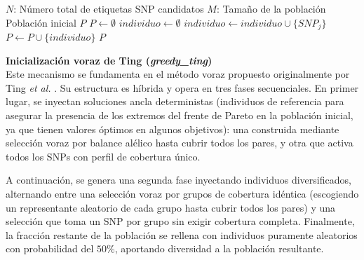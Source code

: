 \begin{algorithm}[H]
\caption{Inicialización aleatoria densa (\textit{random\_dense})}
\begin{algorithmic}[1]
\Require $N$: Número total de etiquetas SNP candidatos
\Require $M$: Tamaño de la población
\Ensure Población inicial $P$
\State $P \gets \emptyset$ 
 
    \State $individuo \gets \emptyset$ 
     
         
            \State $individuo \gets individuo \cup \{SNP_j\}$ 
        \EndIf
    \EndFor
    \State $P \gets P \cup \{individuo\}$
\EndFor
\State \Return $P$
\end{algorithmic}
\end{algorithm}

\textbf{Inicialización voraz de Ting (\textit{greedy\_ting})} \\
Este mecanismo se fundamenta en el método voraz propuesto originalmente por Ting \textit{et al.} \cite{ting2010multi}. Su estructura es híbrida y opera en tres fases secuenciales. En primer lugar, se inyectan soluciones ancla deterministas (individuos de referencia para asegurar la presencia de los extremos del frente de Pareto en la población inicial, ya que tienen valores óptimos en algunos objetivos): una construida mediante selección voraz por balance alélico hasta cubrir todos los pares, y otra que activa todos los SNPs con perfil de cobertura único.

A continuación, se genera una segunda fase inyectando individuos diversificados, alternando entre una selección voraz por grupos de cobertura idéntica (escogiendo un representante aleatorio de cada grupo hasta cubrir todos los pares) y una selección que toma un SNP por grupo sin exigir cobertura completa. Finalmente, la fracción restante de la población se rellena con individuos puramente aleatorios con probabilidad del $50\%$, aportando diversidad a la población resultante.

